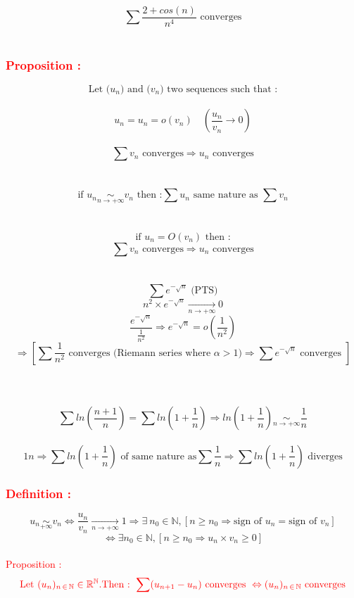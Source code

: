 \documentclass[a4paper,12pt]{article}
\begin{document}
 \[
\sum \frac{2 + cos(n)}{n^4} \text{ converges}
\] 
\\
\textcolor{red}{\subsubsection*{Proposition :}}
{\textcolor{red}{}}
\[
\text{Let (} u_n \text{) and (} v_n\text{) two sequences such that :}
\] \\
\[
u_n = u_n = o(v_n) \quad(\frac{u_n}{v_n} \to 0) 
\]
\\
\[
\sum v_n \text{ converges} \Rightarrow u_n \text { converges}
\]
\\
{\textcolor{red}{}}\\
\[\text{if } u_n \underset{n \to +\infty}{\sim} v_n \text{ then :} \sum u_n \text{ same nature as } \sum v_n
\] \\
{\textcolor{red}{}}\\
\[
\text{if } u_n = O(v_n) \text{ then :}
\] 
\[
\sum v_n \text{ converges} \Rightarrow u_n \text { converges}
\] \\
{}\\
\[
\sum e^{-\sqrt{n}} \text{ (PTS)}
\]
\[
n^2 \times e^{-\sqrt{n}}  \underset{n \to +\infty}{\to} 0
\]
\[
\frac{e^{-\sqrt{n}}}{\frac{1}{n^2}} \Rightarrow e^{-\sqrt{n}} = o(\frac{1}{n^2}) 
\]
\[\Rightarrow [\sum \frac{1}{n^2} \text{ converges (Riemann series where } \alpha > 1\text{)} \Rightarrow \sum  e^{-\sqrt{n}} \text{ converges } ]
\]
\\
\\
{}\\
\[
\sum ln(\frac{n+1}{n}) = \sum ln(1 + \frac{1}{n}) \Rightarrow ln(1+\frac{1}{n}) \underset{n \to +\infty}{\sim} \frac{1}{n}
\] \\
\[{1}{n}
\Rightarrow \sum ln(1+\frac{1}{n}) \text{ of same nature as} \sum \frac{1}{n} \Rightarrow \sum ln(1+\frac{1}{n}) \text{ diverges}
\]
\bigskip
\textcolor{red}{\subsubsection*{Definition :}}
\[
u_n \underset{+\infty}{\sim} v_n \Leftrightarrow \frac{u_n}{v_n} \underset{n \to +\infty}{\to} 1 \Rightarrow \exists \: n_0 \in \mathbb{N}, [n\ge n_0 \Rightarrow \text{sign of } u_n = \text{sign of } v_n] 
\]
\[
\Leftrightarrow \exists n_0 \in \mathbb{N}, [n \ge n_0 \Rightarrow u_n \times v_n \ge 0]
\]
\\
\textcolor{red}{Proposition :}
\[
\textcolor{red}{\text{Let } (u_n)_{n \,\in \,\mathbb{N}} \in \mathbb{R}^\mathbb{N}. \text{Then : }\sum(u_{n+1} -u_n) \text{ converges } \Leftrightarrow  (u_n)_{n\, \in\,\mathbb{N}} \text{ converges} }
\]
\end{document}
